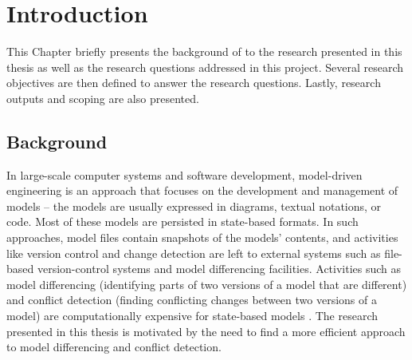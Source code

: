 \chapter{Introduction}
\label{ch:introduction}
This Chapter briefly presents the background of to the research presented in this thesis as well as the research questions addressed in this project. Several research objectives are then defined to answer the research questions. 
Lastly, research outputs and scoping are also presented. 

\section{Background}
\label{sec:background}
In large-scale computer systems and software development, model-driven engineering is an approach that focuses on the development and management of models -- the models are usually expressed in diagrams, textual notations, or code. Most of these models are persisted in state-based formats. In such approaches, model files contain snapshots of the models' contents, and activities like version control and change detection are left to external systems such as file-based version-control systems and model differencing facilities. Activities such as model differencing (identifying parts of two versions of a model that are different) and conflict detection (finding conflicting changes between two versions of a model) are computationally expensive for state-based models \cite{Kolovos:2009:DMM:1564596.1564641}. The research presented in this thesis is motivated by the need to find a more efficient approach to model differencing and conflict detection.

